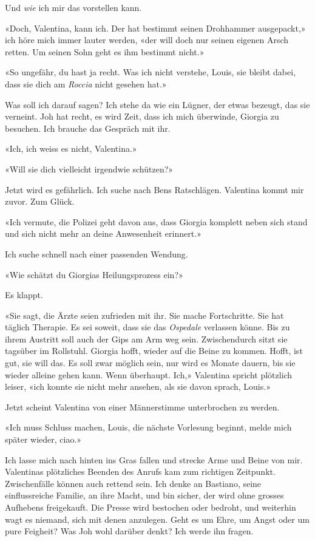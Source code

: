 Und \emph{wie} ich mir das vorstellen kann.

«Doch, Valentina, kann ich. Der hat bestimmt seinen Drohhammer
ausgepackt,» ich höre mich immer lauter werden, «der will doch nur
seinen eigenen Arsch retten. Um seinen Sohn geht es ihm bestimmt nicht.»

«So ungefähr, du hast ja recht. Was ich nicht verstehe, Louis, sie
bleibt dabei, dass sie dich am \emph{Roccia} nicht gesehen hat.»

Was soll ich darauf sagen? Ich stehe da wie ein Lügner, der etwas
bezeugt, das sie verneint. Joh hat recht, es wird Zeit, dass ich mich
überwinde, Giorgia zu besuchen. Ich brauche das Gespräch mit ihr.

«Ich, ich weiss es nicht, Valentina.»

«Will sie dich vielleicht irgendwie schützen?»

Jetzt wird es gefährlich. Ich suche nach Bens Ratschlägen.
Valentina kommt mir zuvor. Zum Glück.

«Ich vermute, die Polizei geht davon aus, dass Giorgia komplett neben
sich stand und sich nicht mehr an deine Anwesenheit erinnert.»

Ich suche schnell nach einer passenden Wendung.

«Wie schätzt du Giorgias Heilungsprozess ein?»

Es klappt.

«Sie sagt, die Ärzte seien zufrieden mit ihr. Sie mache Fortschritte.
Sie hat täglich Therapie. Es sei soweit, dass sie das \emph{Ospedale}
verlassen könne. Bis zu ihrem Austritt soll auch der Gips am Arm weg
sein. Zwischendurch sitzt sie tagsüber im Rollstuhl. Giorgia hofft,
wieder auf die Beine zu kommen. Hofft, ist gut, sie will das. Es soll
zwar möglich sein, nur wird es Monate dauern, bis sie wieder alleine
gehen kann. Wenn überhaupt. Ich,» Valentina spricht plötzlich leiser,
«ich konnte sie nicht mehr ansehen, als sie davon sprach, Louis.»

Jetzt scheint Valentina von einer Männerstimme unterbrochen zu werden.

«Ich muss Schluss machen, Louis, die nächste Vorlesung beginnt, melde
mich später wieder, ciao.»

Ich lasse mich nach hinten ins Gras fallen und strecke Arme und Beine
von mir. Valentinas plötzliches Beenden des Anrufs kam zum richtigen
Zeitpunkt. Zwischenfälle können auch rettend sein.
Ich denke an Bastiano, seine einflussreiche Familie, an ihre Macht, und
bin sicher, der wird ohne grosses Aufhebens freigekauft. Die Presse
wird bestochen oder bedroht, und weiterhin wagt es niemand, sich mit
denen anzulegen. Geht es um Ehre, um Angst oder um pure Feigheit? Was
Joh wohl darüber denkt? Ich werde ihn fragen.

